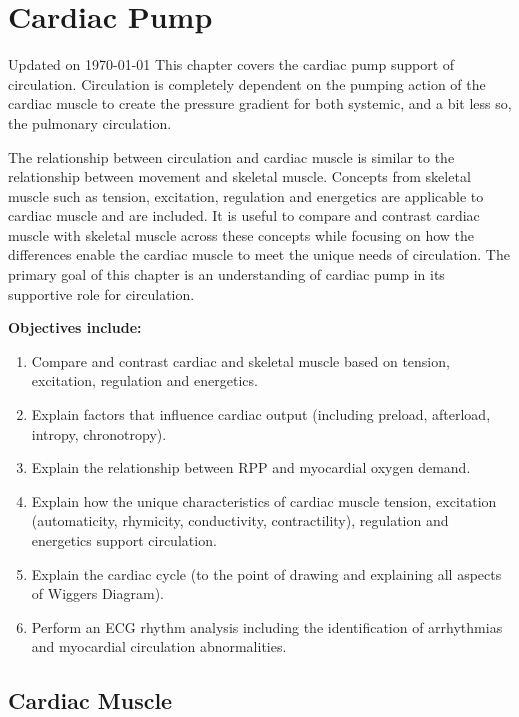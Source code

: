 
\chapter{Cardiac Pump}\label{chp:cardiac_pump}
Updated on \today
\minitoc
This chapter covers the cardiac pump support of circulation. Circulation is completely dependent on the pumping action of the cardiac muscle to create the pressure gradient for both systemic, and a bit less so, the pulmonary circulation. 

The relationship between circulation and cardiac muscle is similar to the relationship between movement and skeletal muscle. Concepts from skeletal muscle such as tension, excitation, regulation and energetics are applicable to cardiac muscle and are included. It is useful to compare and contrast cardiac muscle with skeletal muscle across these concepts while focusing on how the differences enable the cardiac muscle to meet the unique needs of circulation. The primary goal of this chapter is an understanding of cardiac pump in its supportive role for circulation. 

\vspace{5mm}
\begin{svgraybox}
\textbf{Objectives include:}
\begin{enumerate}
    \item Compare and contrast cardiac and skeletal muscle based on tension, excitation, regulation and energetics.
    \item Explain factors that influence cardiac output (including preload, afterload, intropy, chronotropy).
    \item Explain the relationship between RPP and myocardial oxygen demand.
    \item Explain how the unique characteristics of cardiac muscle tension, excitation (automaticity, rhymicity, conductivity, contractility), regulation and energetics support circulation.
    \item Explain the cardiac cycle (to the point of drawing and explaining all aspects of Wiggers Diagram).
    \item Perform an ECG rhythm analysis including the identification of arrhythmias and myocardial circulation abnormalities.
\end{enumerate}
\end{svgraybox}

\section{Cardiac Muscle}


